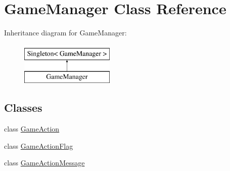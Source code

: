 \hypertarget{class_game_manager}{\section{Game\-Manager Class Reference}
\label{class_game_manager}
}
Inheritance diagram for Game\-Manager\-:\begin{figure}[H]
\begin{center}
\leavevmode
\includegraphics[height=2.000000cm]{class_game_manager}
\end{center}
\end{figure}
\subsection*{Classes}
\begin{DoxyCompactItemize}
\item 
class \hyperlink{class_game_manager_1_1_game_action}{Game\-Action}
\item 
class \hyperlink{class_game_manager_1_1_game_action_flag}{Game\-Action\-Flag}
\item 
class \hyperlink{class_game_manager_1_1_game_action_message}{Game\-Action\-Message}
\end{DoxyCompactItemize}
